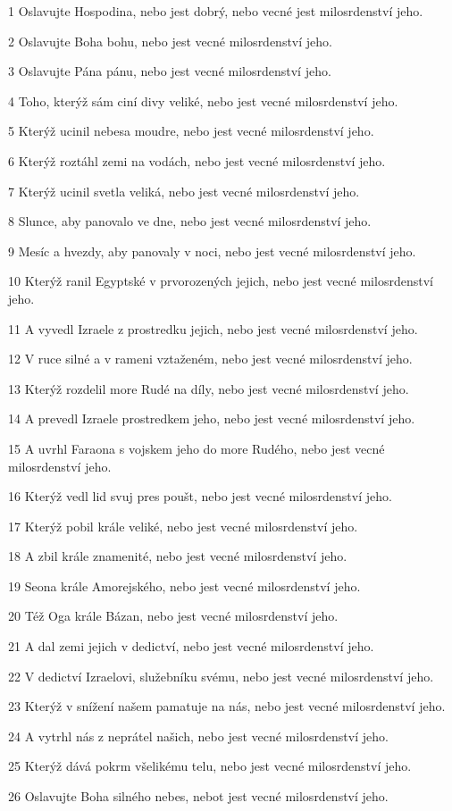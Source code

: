 \par 1 Oslavujte Hospodina, nebo jest dobrý, nebo vecné jest milosrdenství jeho.
\par 2 Oslavujte Boha bohu, nebo jest vecné milosrdenství jeho.
\par 3 Oslavujte Pána pánu, nebo jest vecné milosrdenství jeho.
\par 4 Toho, kterýž sám ciní divy veliké, nebo jest vecné milosrdenství jeho.
\par 5 Kterýž ucinil nebesa moudre, nebo jest vecné milosrdenství jeho.
\par 6 Kterýž roztáhl zemi na vodách, nebo jest vecné milosrdenství jeho.
\par 7 Kterýž ucinil svetla veliká, nebo jest vecné milosrdenství jeho.
\par 8 Slunce, aby panovalo ve dne, nebo jest vecné milosrdenství jeho.
\par 9 Mesíc a hvezdy, aby panovaly v noci, nebo jest vecné milosrdenství jeho.
\par 10 Kterýž ranil Egyptské v prvorozených jejich, nebo jest vecné milosrdenství jeho.
\par 11 A vyvedl Izraele z prostredku jejich, nebo jest vecné milosrdenství jeho.
\par 12 V ruce silné a v rameni vztaženém, nebo jest vecné milosrdenství jeho.
\par 13 Kterýž rozdelil more Rudé na díly, nebo jest vecné milosrdenství jeho.
\par 14 A prevedl Izraele prostredkem jeho, nebo jest vecné milosrdenství jeho.
\par 15 A uvrhl Faraona s vojskem jeho do more Rudého, nebo jest vecné milosrdenství jeho.
\par 16 Kterýž vedl lid svuj pres poušt, nebo jest vecné milosrdenství jeho.
\par 17 Kterýž pobil krále veliké, nebo jest vecné milosrdenství jeho.
\par 18 A zbil krále znamenité, nebo jest vecné milosrdenství jeho.
\par 19 Seona krále Amorejského, nebo jest vecné milosrdenství jeho.
\par 20 Též Oga krále Bázan, nebo jest vecné milosrdenství jeho.
\par 21 A dal zemi jejich v dedictví, nebo jest vecné milosrdenství jeho.
\par 22 V dedictví Izraelovi, služebníku svému, nebo jest vecné milosrdenství jeho.
\par 23 Kterýž v snížení našem pamatuje na nás, nebo jest vecné milosrdenství jeho.
\par 24 A vytrhl nás z neprátel našich, nebo jest vecné milosrdenství jeho.
\par 25 Kterýž dává pokrm všelikému telu, nebo jest vecné milosrdenství jeho.
\par 26 Oslavujte Boha silného nebes, nebot jest vecné milosrdenství jeho.

